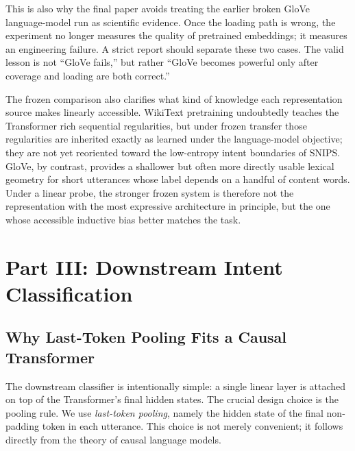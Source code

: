 \documentclass[10pt,a4paper]{article}
\begin{document}
This is also why the final paper avoids treating the earlier broken GloVe language-model run as scientific evidence. Once the loading path is wrong, the experiment no longer measures the quality of pretrained embeddings; it measures an engineering failure. A strict report should separate these two cases. The valid lesson is not ``GloVe fails,'' but rather ``GloVe becomes powerful only after coverage and loading are both correct.''

The frozen comparison also clarifies what kind of knowledge each representation source makes linearly accessible. WikiText pretraining undoubtedly teaches the Transformer rich sequential regularities, but under frozen transfer those regularities are inherited exactly as learned under the language-model objective; they are not yet reoriented toward the low-entropy intent boundaries of SNIPS. GloVe, by contrast, provides a shallower but often more directly usable lexical geometry for short utterances whose label depends on a handful of content words. Under a linear probe, the stronger frozen system is therefore not the representation with the most expressive architecture in principle, but the one whose accessible inductive bias better matches the task.

\FloatBarrier


\section{Part III: Downstream Intent Classification}
\label{sec:part3}

\subsection{Why Last-Token Pooling Fits a Causal Transformer}
\label{sec:last_token}

The downstream classifier is intentionally simple: a single linear layer is attached on top of the Transformer's final hidden states. The crucial design choice is the pooling rule. We use \emph{last-token pooling}, namely the hidden state of the final non-padding token in each utterance. This choice is not merely convenient; it follows directly from the theory of causal language models.
\end{document}
